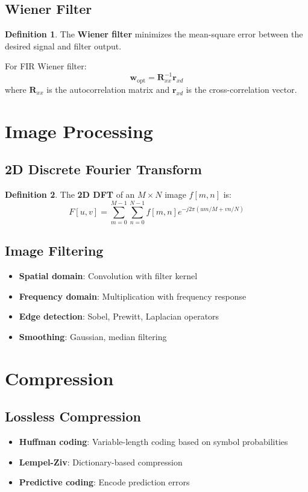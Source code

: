 \documentclass[11pt]{article}
\theoremstyle{definition}
\newtheorem{definition}{Definition}[section]
\begin{document}
\subsection{Wiener Filter}
\begin{definition}
The \textbf{Wiener filter} minimizes the mean-square error between the desired signal and filter output.
\end{definition}

For FIR Wiener filter:
$$\mathbf{w}_{\text{opt}} = \mathbf{R}_{xx}^{-1} \mathbf{r}_{xd}$$
where $\mathbf{R}_{xx}$ is the autocorrelation matrix and $\mathbf{r}_{xd}$ is the cross-correlation vector.

\section{Image Processing}

\subsection{2D Discrete Fourier Transform}
\begin{definition}
The \textbf{2D DFT} of an $M \times N$ image $f[m,n]$ is:
$$F[u,v] = \sum_{m=0}^{M-1} \sum_{n=0}^{N-1} f[m,n] e^{-j2\pi(um/M + vn/N)}$$
\end{definition}

\subsection{Image Filtering}
\begin{itemize}
    \item \textbf{Spatial domain}: Convolution with filter kernel
    \item \textbf{Frequency domain}: Multiplication with frequency response
    \item \textbf{Edge detection}: Sobel, Prewitt, Laplacian operators
    \item \textbf{Smoothing}: Gaussian, median filtering
\end{itemize}

\section{Compression}

\subsection{Lossless Compression}
\begin{itemize}
    \item \textbf{Huffman coding}: Variable-length coding based on symbol probabilities
    \item \textbf{Lempel-Ziv}: Dictionary-based compression
    \item \textbf{Predictive coding}: Encode prediction errors
\end{itemize}
\end{document}
